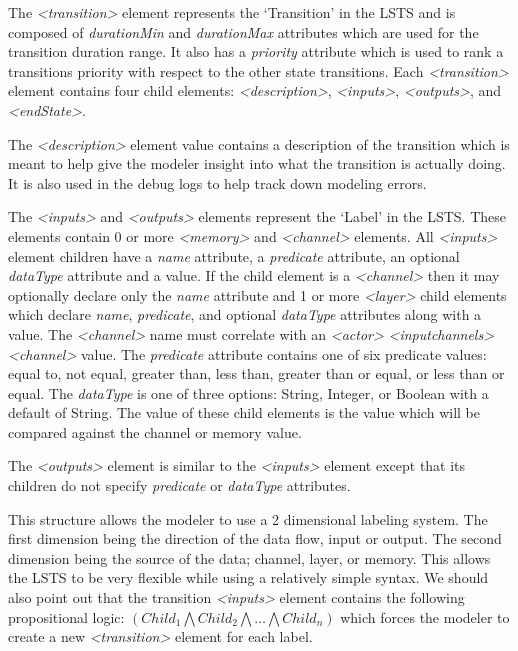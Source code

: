 The {\em \textless transition\textgreater} element represents the `Transition' in the LSTS and is composed of {\em durationMin} and {\em durationMax} attributes which are used for the transition duration range.  It also has a {\em priority} attribute which is used to rank a transitions priority with respect to the other state transitions.  Each {\em \textless transition\textgreater} element contains four child elements: {\em \textless description\textgreater}, {\em \textless inputs\textgreater}, {\em \textless outputs\textgreater}, and {\em \textless endState\textgreater}.  

The {\em \textless description\textgreater} element value contains a description of the transition which is meant to help give the modeler insight into what the transition is actually doing.  It is also used in the debug logs to help track down modeling errors.  

The {\em \textless inputs\textgreater} and {\em \textless outputs\textgreater} elements represent the `Label' in the LSTS.  These elements contain 0 or more {\em \textless memory\textgreater} and {\em \textless channel\textgreater} elements.  All {\em \textless inputs\textgreater} element children have a {\em name} attribute, a {\em predicate} attribute, an optional {\em dataType} attribute and a value.  If the child element is a {\em \textless channel\textgreater} then it may optionally declare only the {\em name} attribute and 1 or more {\em \textless layer\textgreater} child elements which declare {\em name}, {\em predicate}, and optional {\em dataType} attributes along with a value.  The {\em \textless channel\textgreater} name must correlate with an {\em \textless actor\textgreater} {\em \textless inputchannels\textgreater} {\em \textless channel\textgreater} value.  The {\em predicate} attribute contains one of six predicate values: equal to, not equal, greater than, less than, greater than or equal, or less than or equal.  The {\em dataType} is one of three options: String, Integer, or Boolean with a default of String.  The value of these child elements is the value which will be compared against the channel or memory value.  

The {\em \textless outputs\textgreater} element is similar to the {\em \textless inputs\textgreater} element except that its children do not specify {\em predicate} or {\em dataType} attributes.  

This structure allows the modeler to use a 2 dimensional labeling system.  The first dimension being the direction of the data flow, input or output.  The second dimension being the source of the data; channel, layer, or memory.  This allows the LSTS to be very flexible while using a relatively simple syntax.  We should also point out that the transition {\em \textless inputs\textgreater} element contains the following propositional logic: $(Child_{1} \bigwedge Child_{2} \bigwedge \ldots \bigwedge Child_{n})$ which forces the modeler to create a new {\em \textless transition\textgreater} element for each label.

